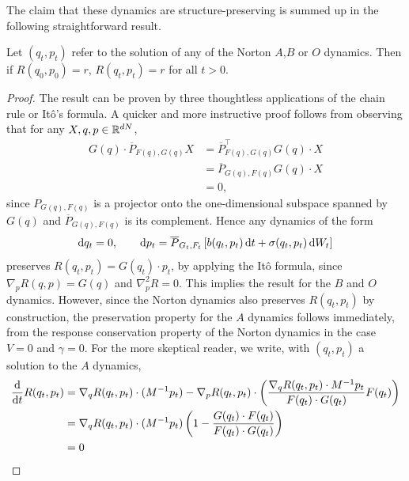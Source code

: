 The claim that these dynamics are structure-preserving is summed up in the following straightforward result.
\begin{lemma}
    Let $(q_t,p_t)$ refer to the solution of any of the Norton $A$,$B$ or $O$ dynamics. Then if $R(q_0,p_0)=r$, $R(q_t,p_t)=r$ for all $t>0$.
\end{lemma}
\begin{proof}
    The result can be proven by three thoughtless applications of the chain rule or Itô's formula.
    A quicker and more instructive proof follows from observing that for any $X,q,p\in \mathbb{R}^{dN}$, 
    \begin{align*}
        G(q) \cdot \overline{P}_{F(q),G(q)} X &= \overline{P}_{F(q),G(q)}^{\intercal}G(q)\cdot X\\
        &=\overline{P}_{G(q),F(q)}G(q)\cdot X\\
        &=0,
    \end{align*}
    since $P_{G(q),F(q)}$ is a projector onto the one-dimensional subspace spanned by $G(q)$ and $\overline{P}_{G(q),F(q)}$ is its complement. Hence any dynamics of the form 
    \[\mathrm{d} q_t =0,\qquad \mathrm{d} p_t = \overline{P}_{G_t,F_t}\left[b(q_t,p_t)\,\mathrm{d} t +\sigma(q_t,p_t)\,\mathrm{d} W_t\right]\]
    preserves $R(q_t,p_t)=G(q_t)\cdot p_t$, by applying the Itô formula, since $\nabla_p R(q,p)=G(q)$ and $\nabla_p^2 R=0$.
    This implies the result for the $B$ and $O$ dynamics. However, since the Norton dynamics also preserves $R(q_t,p_t)$ by construction, 
    the preservation property for the $A$ dynamics follows immediately, from the response conservation property of the Norton dynamics in the case $V=0$ and $\gamma=0$.
    For the more skeptical reader, we write, with $(q_t,p_t)$ a solution to the $A$ dynamics,
    \begin{align*}
        \frac{\mathrm{d}}{\mathrm{d} t} R(q_t,p_t) &= \nabla_q R(q_t,p_t)\cdot (M^{-1}p_t) -\nabla_p R(q_t,p_t)\cdot \left(\frac{\nabla_q R(q_t,p_t)\cdot M^{-1}p_t}{F(q_t)\cdot G(q_t)}F(q_t)\right)\\
        &= \nabla_q R(q_t,p_t)\cdot (M^{-1}p_t)\left(1-\frac{G(q_t)\cdot F(q_t)}{F(q_t)\cdot G(q_t)}\right)\\
        &=0
    \end{align*}
\end{proof}

